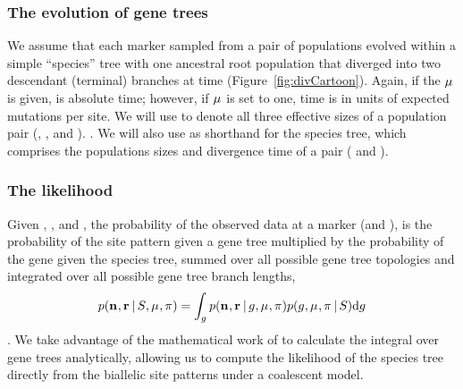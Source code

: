 \subsubsection{The evolution of gene trees}

We assume that each marker sampled from a pair of populations evolved within a
simple ``species'' tree with one ancestral root population that diverged into
two descendant (terminal) branches at time \comparisondivtime
(Figure~\ref{fig:divCartoon}).
Again, if the $\mu_{}$ is given, \comparisondivtime is absolute time; however,
if $\mu_{}$ is set to one, time is in units of expected mutations per site.
We will use
\comparisonpopsizes{}
to denote all three
effective sizes of a population pair
(\epopsize[\rootpopindex],
\epopsize[\descendantpopindex{1}],
and \epopsize[\descendantpopindex{2}]).
.
We will also use
\sptree{}
as shorthand for the species tree, which comprises the populations sizes and
divergence time of a pair
(\comparisonpopsizes{} and \comparisondivtime{}).

\subsubsection{The likelihood}

\begin{linenomath}
Given \murate, \gfreq, \comparisondivtime and \comparisonpopsizes, the
probability of the observed data at a marker (\allelecount and \redallelecount),
is the probability of the site pattern given a gene tree multiplied by the
probability of the gene given the species tree, summed over all possible gene
tree topologies and integrated over all possible gene tree branch lengths,
\begin{equation}
    p(\mathbf{n}_{}, \mathbf{r}_{} \,|\, S_{}, \mu_{}, \pi_{})
    =
    \int_{g_{}}
    p(\mathbf{n}_{}, \mathbf{r}_{} \,|\, g_{}, \mu_{}, \pi_{})
    p(g_{}, \mu_{}, \pi_{} \,|\, S_{})
    \mathrm{d}g_{}
    \label{eq:markerlikelihood}
\end{equation}
\citep{Felsenstein1988,Nielsen2001,Rannala2003}.
We take advantage of the mathematical work of \citep{Bryant2012} to calculate
the integral over gene trees analytically, allowing us to compute the
likelihood of the species tree directly from the biallelic site patterns under
a coalescent model.
\end{linenomath}


